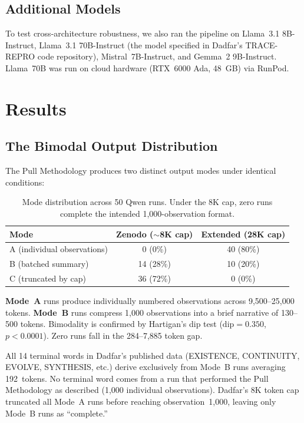 \documentclass[11pt]{article}
\begin{document}
\subsection{Additional Models}

To test cross-architecture robustness, we also ran the pipeline on
Llama~3.1 8B-Instruct, Llama~3.1 70B-Instruct (the model specified in
Dadfar's TRACE-REPRO code repository), Mistral~7B-Instruct, and
Gemma~2 9B-Instruct. Llama~70B was run on cloud hardware
(RTX~6000 Ada, 48~GB) via RunPod.


\section{Results}

\subsection{The Bimodal Output Distribution}

The Pull Methodology produces two distinct output modes under identical
conditions:

\begin{table}[t]
\centering
\begin{tabular}{lcc}
\toprule
Mode & Zenodo ($\sim$8K cap) & Extended (28K cap) \\
\midrule
A (individual observations) & 0 (0\%) & 40 (80\%) \\
B (batched summary) & 14 (28\%) & 10 (20\%) \\
C (truncated by cap) & 36 (72\%) & 0 (0\%) \\
\bottomrule
\end{tabular}
\caption{Mode distribution across 50 Qwen runs. Under the 8K cap,
zero runs complete the intended 1,000-observation format.}
\label{tab:modes}
\end{table}

\textbf{Mode~A} runs produce individually numbered observations across
9,500--25,000 tokens. \textbf{Mode~B} runs compress 1,000 observations
into a brief narrative of 130--500 tokens. Bimodality is confirmed by
Hartigan's dip test ($\text{dip} = 0.350$, $p < 0.0001$). Zero runs
fall in the 284--7,885 token gap.

All 14 terminal words in Dadfar's published data (EXISTENCE,
CONTINUITY, EVOLVE, SYNTHESIS, etc.) derive exclusively from Mode~B
runs averaging 192~tokens. No terminal word comes from a run that
performed the Pull Methodology as described (1,000 individual
observations). Dadfar's 8K token cap truncated all Mode~A runs before
reaching observation~1,000, leaving only Mode~B runs as ``complete.''
\end{document}
